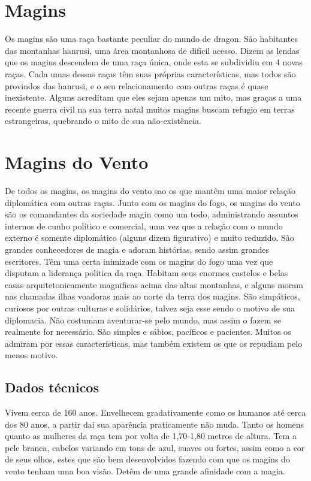 \section{Magins}

Os magins são uma raça bastante peculiar do mundo de dragon. São habitantes das montanhas hanrusi, uma área montanhosa de difícil acesso. Dizem as lendas que os magins descendem de uma raça única, onde esta se subdividiu em 4 novas raças. Cada umas dessas raças têm suas próprias características, mas todos são provindos das hanrusi, e o seu relacionamento com outras raças é quase inexistente. Alguns acreditam que eles sejam apenas um mito, mas graças a uma recente guerra civil na sua terra natal muitos magins buscam refugio em terras estrangeiras, quebrando o mito de sua não-existência.

\section{Magins do Vento}

De todos os magins, os magins do vento sao os que mantêm uma maior relação diplomática com outras raças. Junto com os magins do fogo, os magins do vento são os comandantes da sociedade magin como um todo, administrando assuntos internos de cunho político e comercial, uma vez que a relação com o mundo externo é somente diplomático (alguns dizem figurativo) e muito reduzido. São grandes conhecedores de magia e adoram histórias, sendo assim grandes escritores. Têm uma certa inimizade com os magins do fogo uma vez que disputam a liderança politica da raça. Habitam seus enormes castelos e belas casas arquitetonicamente magnificas acima das altas montanhas, e alguns moram nas chamadas ilhas voadoras mais ao norte da terra dos magins. São simpáticos, curiosos por outras culturas e solidários, talvez seja esse sendo o motivo de sua diplomacia. Não costumam aventurar-se pelo mundo, mas assim o fazem se realmente for necessário. São simples e sábios, pacíficos e pacientes. Muitos os admiram por essas características, mas também existem os que os repudiam pelo menos motivo.

\subsection{Dados técnicos}


Vivem cerca de 160 anos. Envelhecem gradativamente como os humanos até cerca dos 80 anos, a partir dai sua aparência praticamente não muda. Tanto os homens quanto as mulheres da raça tem por volta de 1,70-1,80 metros de altura. Tem a pele branca, cabelos variando em tons de azul, suaves ou fortes, assim como a cor de seus olhos, estes que são bem desenvolvidos fazendo com que os magins do vento tenham uma boa visão. Detêm de uma grande afinidade com a magia.


